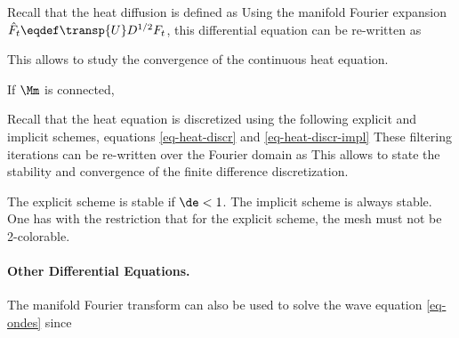 Recall that the heat diffusion is defined as
Using the manifold Fourier expansion $\hat F_t \eqdef \transp{U} D^{1/2}  F_t$, this differential equation can be re-written as

This allows to study the convergence of the continuous heat equation.

\begin{thm}\label{thm-cv-hear-discr} If $\Mm$ is connected, 
\end{thm}

Recall that the heat equation is discretized using the following explicit and implicit schemes, equations \eqref{eq-heat-discr} and \eqref{eq-heat-discr-impl}
These filtering iterations can be re-written over the Fourier domain as 
This allows to state the stability and convergence of the finite difference discretization.

\begin{thm}
	The explicit scheme is stable if $\de < 1$. The implicit scheme is always stable.
	One has
	with the restriction that for the explicit scheme, the mesh must not be 2-colorable.
\end{thm}

\paragraph{Other Differential Equations.}

The manifold Fourier transform can also be used to solve the wave equation \eqref{eq-ondes} since

